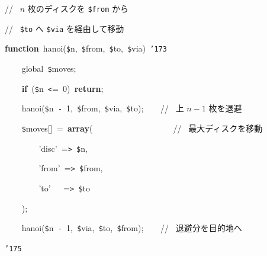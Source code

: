 \documentclass[a4paper,10pt]{article}
\def\mc{\relax}
\begin{document}
\noindent
\mbox{}\rm\mc // \ $n$ 枚のディスクを {\tt \$from} から
\tt\mc 

\noindent
\mbox{}\rm\mc // \    {\tt \$to} へ {\tt \$via} を経由して移動 \hfill
\tt\mc 

\noindent
\mbox{}\textbf{function}{\tt\mc \ }hanoi({\tt\$}n,{\tt\mc \ }{\tt\$}from,{\tt\mc \ }{\tt\$}to,{\tt\mc \ }{\tt\$}via){\tt\mc \ }{\tt\char'173}

\noindent
\mbox{}{\tt\mc \ }{\tt\mc \ }{\tt\mc \ }{\tt\mc \ }global{\tt\mc \ }{\tt\$}moves;

\noindent
\mbox{}{\tt\mc \ }{\tt\mc \ }{\tt\mc \ }{\tt\mc \ }\textbf{if}{\tt\mc \ }({\tt\$}n{\tt\mc \ }{\tt <}={\tt\mc \ }0){\tt\mc \ }\textbf{return};

\noindent
\mbox{}{\tt\mc \ }{\tt\mc \ }{\tt\mc \ }{\tt\mc \ }hanoi({\tt\$}n{\tt\mc \ }{\tt -}{\tt\mc \ }1,{\tt\mc \ }{\tt\$}from,{\tt\mc \ }{\tt\$}via,{\tt\mc \ }{\tt\$}to);{\tt\mc \ }{\tt\mc \ }{\tt\mc \ }{\tt\mc \ }\rm\mc // \ 上 $n-1$ 枚を退避 \hfill
\tt\mc 

\noindent
\mbox{}{\tt\mc \ }{\tt\mc \ }{\tt\mc \ }{\tt\mc \ }{\tt\$}moves[]{\tt\mc \ }={\tt\mc \ }\textbf{array}({\tt\mc \ }{\tt\mc \ }{\tt\mc \ }{\tt\mc \ }{\tt\mc \ }{\tt\mc \ }{\tt\mc \ }{\tt\mc \ }{\tt\mc \ }{\tt\mc \ }{\tt\mc \ }{\tt\mc \ }{\tt\mc \ }{\tt\mc \ }{\tt\mc \ }{\tt\mc \ }{\tt\mc \ }{\tt\mc \ }{\tt\mc \ }\rm\mc // \ 最大ディスクを移動 \hfill
\tt\mc 

\noindent
\mbox{}{\tt\mc \ }{\tt\mc \ }{\tt\mc \ }{\tt\mc \ }{\tt\mc \ }{\tt\mc \ }{\tt\mc \ }{\tt\mc \ }'disc'{\tt\mc \ }={\tt >}{\tt\mc \ }{\tt\$}n,

\noindent
\mbox{}{\tt\mc \ }{\tt\mc \ }{\tt\mc \ }{\tt\mc \ }{\tt\mc \ }{\tt\mc \ }{\tt\mc \ }{\tt\mc \ }'from'{\tt\mc \ }={\tt >}{\tt\mc \ }{\tt\$}from,

\noindent
\mbox{}{\tt\mc \ }{\tt\mc \ }{\tt\mc \ }{\tt\mc \ }{\tt\mc \ }{\tt\mc \ }{\tt\mc \ }{\tt\mc \ }'to'{\tt\mc \ }{\tt\mc \ }{\tt\mc \ }={\tt >}{\tt\mc \ }{\tt\$}to

\noindent
\mbox{}{\tt\mc \ }{\tt\mc \ }{\tt\mc \ }{\tt\mc \ });

\noindent
\mbox{}{\tt\mc \ }{\tt\mc \ }{\tt\mc \ }{\tt\mc \ }hanoi({\tt\$}n{\tt\mc \ }{\tt -}{\tt\mc \ }1,{\tt\mc \ }{\tt\$}via,{\tt\mc \ }{\tt\$}to,{\tt\mc \ }{\tt\$}from);{\tt\mc \ }{\tt\mc \ }{\tt\mc \ }{\tt\mc \ }\rm\mc // \ 退避分を目的地へ \hfill
\tt\mc 

\noindent
\mbox{}{\tt\char'175}

\noindent
\mbox{}\hfill
\end{document}
